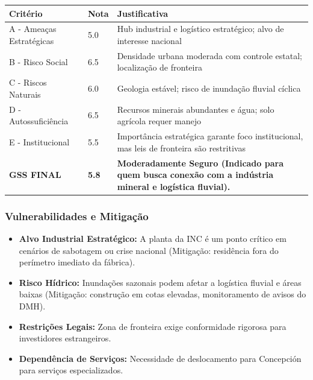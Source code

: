 \begin{table}[ht!]
\small \begin{tabular}{p{3.0cm}p{0.8cm}p{6.0cm}} \toprule
\textbf{Critério} & \textbf{Nota} & \textbf{Justificativa} \\ \midrule
A - Ameaças Estratégicas & 5.0 & Hub industrial e logístico estratégico; alvo de interesse nacional \\
B - Risco Social & 6.5 & Densidade urbana moderada com controle estatal; localização de fronteira \\
C - Riscos Naturais & 6.0 & Geologia estável; risco de inundação fluvial cíclica \\
D - Autossuficiência & 6.5 & Recursos minerais abundantes e água; solo agrícola requer manejo \\
E - Institucional & 5.5 & Importância estratégica garante foco institucional, mas leis de fronteira são restritivas \\
\midrule \textbf{GSS FINAL} & \textbf{5.8} & \textbf{Moderadamente Seguro (Indicado para quem busca conexão com a indústria mineral e logística fluvial).} \\ \bottomrule \end{tabular}
\end{table}
\subsubsection{Vulnerabilidades e
Mitigação}

\begin{itemize}
\tightlist
\item
  \textbf{Alvo Industrial Estratégico:} A planta da INC é um ponto
  crítico em cenários de sabotagem ou crise nacional (Mitigação:
  residência fora do perímetro imediato da fábrica).
\item
  \textbf{Risco Hídrico:} Inundações sazonais podem afetar a logística
  fluvial e áreas baixas (Mitigação: construção em cotas elevadas,
  monitoramento de avisos do DMH).
\item
  \textbf{Restrições Legais:} Zona de fronteira exige conformidade
  rigorosa para investidores estrangeiros.
\item
  \textbf{Dependência de Serviços:} Necessidade de deslocamento para
  Concepción para serviços especializados.
\end{itemize}


